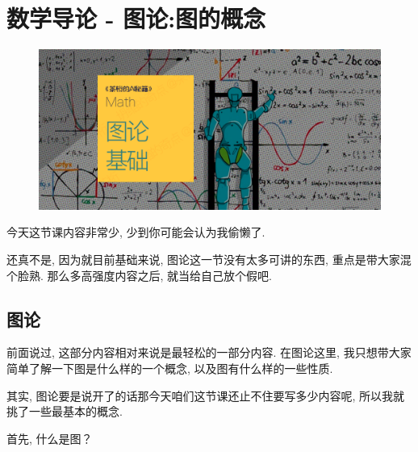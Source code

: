 \chapter{数学导论 - 图论:图的概念}

\begin{figure}[ht]
  \centering
  \includegraphics[width=1\textwidth]{asset/9c5d4a09-70d9-458c-a83d-1096119536fc.png}
\end{figure}

\newpage

今天这节课内容非常少, 少到你可能会认为我偷懒了. 

还真不是, 因为就目前基础来说, 图论这一节没有太多可讲的东西, 重点是带大家混个脸熟. 那么多高强度内容之后, 就当给自己放个假吧. 

\section{图论}

前面说过, 这部分内容相对来说是最轻松的一部分内容. 在图论这里, 我只想带大家简单了解一下图是什么样的一个概念, 以及图有什么样的一些性质. 

其实, 图论要是说开了的话那今天咱们这节课还止不住要写多少内容呢, 所以我就挑了一些最基本的概念. 

首先, 什么是图？

